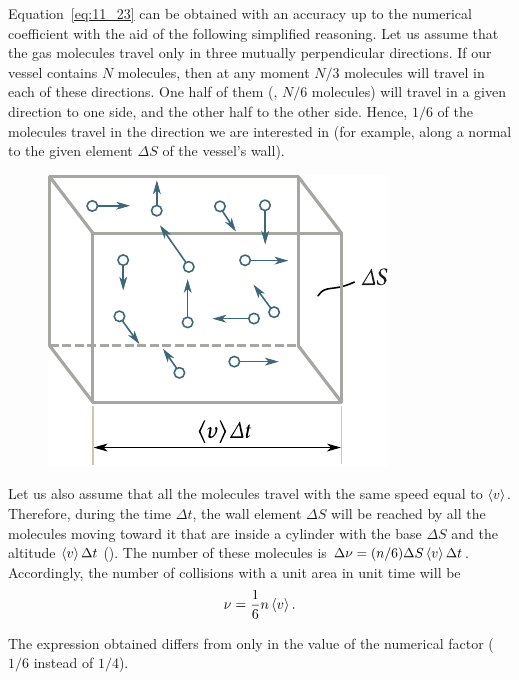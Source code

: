 Equation~\eqref{eq:11_23} can be obtained with an accuracy up to the numerical coefficient with the aid of the following simplified reasoning. Let us assume that the gas molecules travel only in three mutually perpendicular directions. If our vessel contains $N$ molecules, then at any moment $N/3$ molecules will travel in each of these directions. One half of them (\ie, $N/6$ molecules) will travel in a given direction to one side, and the other half to the other side. Hence, $1/6$ of the molecules travel in the direction we are interested in (for example, along a normal to the given element $\Delta S$ of the vessel's wall).

\begin{figure}[t]
	\begin{center}
		\includegraphics[scale=1.0]{figures/ch_11/fig_11_6.pdf}
		\caption[]{}
		\label{fig:11_6}
	\end{center}
	\vspace{-0.8cm}
\end{figure}

Let us also assume that all the molecules travel with the same speed equal to $\left\langle v \right\rangle$. Therefore, during the time $\Delta t$, the wall element $\Delta S$ will be reached by all the molecules moving toward it that are inside a cylinder with the base $\Delta S$ and the altitude $\left\langle v \right\rangle\Delta t$ (). The number of these molecules is $\Delta\nu=(n/6)\Delta S\left\langle v \right\rangle\Delta t$. Accordingly, the number of collisions with a unit area in unit time will be
\begin{equation}\label{eq:11_24}
	\nu = \frac{1}{6}n\left\langle v \right\rangle.
\end{equation}

\noindent
The expression obtained differs from  only in the value of the numerical factor ($1/6$ instead of $1/4$).

